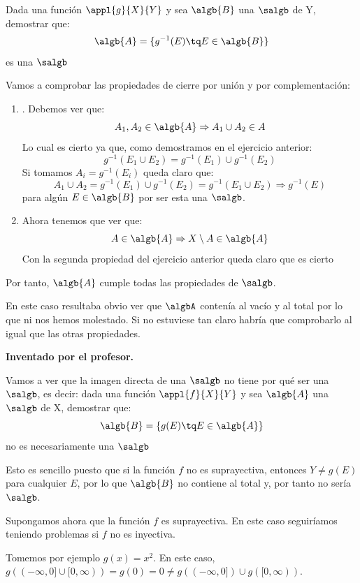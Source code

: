 \begin{problem}[5]
Dada una función $\appl{g}{X}{Y}$ y sea $\algb{B}$ una $\salgb$ de Y, demostrar que:
\[\algb{A}=\{g^{-1}(E) \tq E \in \algb{B}\}\]
es una $\salgb$

\solution
Vamos a comprobar las propiedades de cierre por unión y por complementación:
\begin{enumerate}
\item. Debemos ver que:
\[A_1, A_2\in \algb{A} \Rightarrow A_1 \cup A_2 \in A\]
Lo cual es cierto ya que, como demostramos en el ejercicio anterior:
\[g^{-1}(E_1 \cup E_2)=g^{-1}(E_1) \cup g^{-1}(E_2)\]
Si tomamos $A_i=g^{-1}(E_i)$ queda claro que:
\[A_1 \cup A_2 = g^{-1}(E_1) \cup g^{-1}(E_2) = g^{-1}(E_1\cup E_2) \Rightarrow g^{-1}(E)\]
para algún $E\in \algb{B}$ por ser esta una $\salgb$.

\item Ahora tenemos que ver que:
\[A \in \algb{A} \Rightarrow X\setminus A \in \algb{A}\]
Con la segunda propiedad del ejercicio anterior queda claro que es cierto
\end{enumerate}

Por tanto, $\algb{A}$ cumple todas las propiedades de $\salgb$.

\obs En este caso resultaba obvio ver que $\algbA$ contenía al vacío y al total por lo que ni nos hemos molestado. Si no estuviese tan claro habría que comprobarlo al igual que las otras propiedades.

\end{problem}

\begin{problem}[4-5Bis]
\textbf{Inventado por el profesor.}

Vamos a ver que la imagen directa de una $\salgb$ no tiene por qué ser una $\salgb$, es decir:
dada una función $\appl{f}{X}{Y}$ y sea $\algb{A}$ una $\salgb$ de X, demostrar que:
\[\algb{B}=\{g(E) \tq E \in \algb{A}\}\]
no es necesariamente una $\salgb$

\solution
Esto es sencillo puesto que si la función $f$ no es suprayectiva, entonces $Y \neq g(E)$ para cualquier $E$, por lo que $\algb{B}$ no contiene al total y, por tanto no sería $\salgb$.

Supongamos ahora que  la función $f$ es suprayectiva. En este caso seguiríamos teniendo problemas si $f$ no es inyectiva.

Tomemos por ejemplo $g(x)=x^2$. En este caso, $g((-\infty, 0] \cup [0, \infty))=g(0)=0 \neq g((-\infty, 0]) \cup g([0, \infty))$.
\end{problem}

